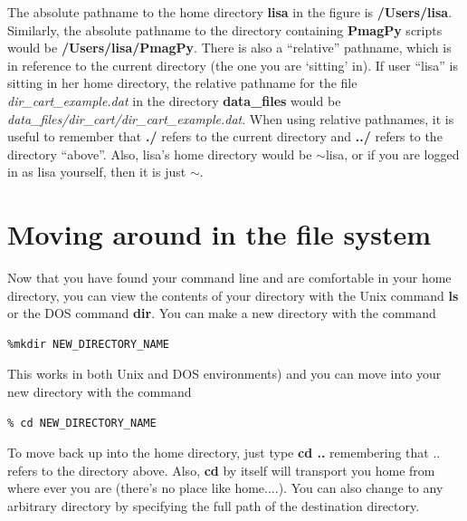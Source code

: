 \documentclass[11pt]{book}
\begin{document}
{The absolute pathname to the home directory {\bf lisa} in the figure is {\bf /Users/lisa}.
Similarly, the absolute pathname to the directory containing {\bf PmagPy}
scripts  would be  {\bf /Users/lisa/PmagPy}.  There is also a ``relative'' pathname,
which is in reference to the  current directory (the one you are `sitting' in).  If user ``lisa'' is sitting in
her home directory, the relative pathname for the file {\it dir\_cart\_example.dat} in the directory
{\bf data\_files} would be {\it data\_files/dir\_cart/dir\_cart\_example.dat}.  When using relative
pathnames, it is useful to remember that {\bf ./} refers to the current
directory and {\bf ../} refers to the directory  ``above''.     Also, lisa's home directory would be $\sim$lisa, or if you are logged in as lisa yourself, then it is just $\sim$.


\section{Moving around in the file system}

Now that you have found your command line and are comfortable in your home directory, you can view the contents of your directory with the Unix command {\bf ls} or the DOS command {\bf dir}.
You can make a new directory with the command
\begin{verbatim}
%mkdir NEW_DIRECTORY_NAME
\end{verbatim}
This works in both Unix and DOS environments) and you can move into your new directory with the command
\begin{verbatim}
% cd NEW_DIRECTORY_NAME
\end{verbatim}
   To move back up into the home directory, just type {\bf cd ..} remembering that .. refers to the directory above.  Also, {\bf cd} by itself will transport you home from where ever you are (there's no place like home....).     You can also change to any arbitrary directory by specifying the full path of the destination directory.


%
%

}
\end{document}
